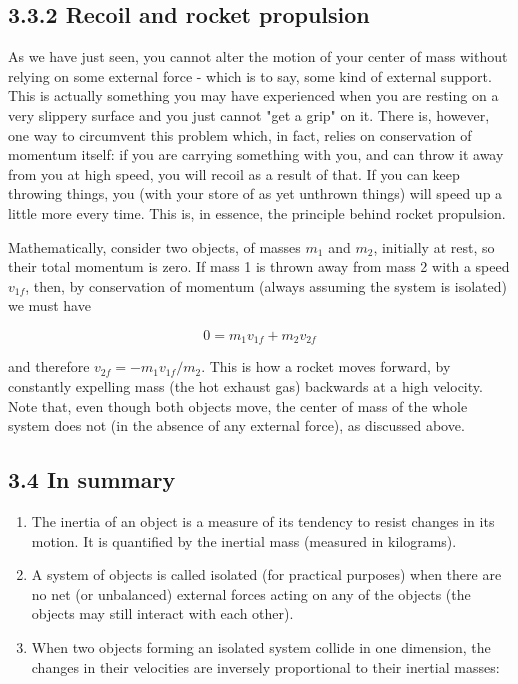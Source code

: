 \documentclass[10pt]{article}
\begin{document}
\subsection*{3.3.2 Recoil and rocket propulsion}
As we have just seen, you cannot alter the motion of your center of mass without relying on some external force - which is to say, some kind of external support. This is actually something you may have experienced when you are resting on a very slippery surface and you just cannot "get a grip" on it. There is, however, one way to circumvent this problem which, in fact, relies on conservation of momentum itself: if you are carrying something with you, and can throw it away from you at high speed, you will recoil as a result of that. If you can keep throwing things, you (with your store of as yet unthrown things) will speed up a little more every time. This is, in essence, the principle behind rocket propulsion.

Mathematically, consider two objects, of masses $m_{1}$ and $m_{2}$, initially at rest, so their total momentum is zero. If mass 1 is thrown away from mass 2 with a speed $v_{1 f}$, then, by conservation of momentum (always assuming the system is isolated) we must have


\begin{equation*}
0=m_{1} v_{1 f}+m_{2} v_{2 f} \tag{3.12}
\end{equation*}


and therefore $v_{2 f}=-m_{1} v_{1 f} / m_{2}$. This is how a rocket moves forward, by constantly expelling mass (the hot exhaust gas) backwards at a high velocity. Note that, even though both objects move, the center of mass of the whole system does not (in the absence of any external force), as discussed above.

\subsection*{3.4 In summary}
\begin{enumerate}
  \item The inertia of an object is a measure of its tendency to resist changes in its motion. It is quantified by the inertial mass (measured in kilograms).
  \item A system of objects is called isolated (for practical purposes) when there are no net (or unbalanced) external forces acting on any of the objects (the objects may still interact with each other).
  \item When two objects forming an isolated system collide in one dimension, the changes in their velocities are inversely proportional to their inertial masses:
\end{enumerate}
\end{document}
